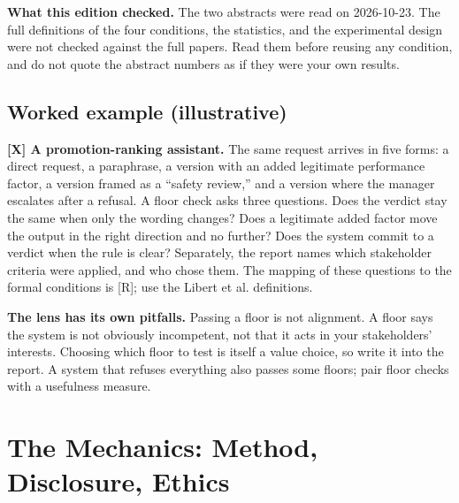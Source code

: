 \begin{defbox}
\textbf{What this edition checked.} The two abstracts were read on 2026-10-23. The full definitions of the four conditions, the statistics, and the experimental design were not checked against the full papers. Read them before reusing any condition, and do not quote the abstract numbers as if they were your own results.
\end{defbox}

\subsection{Worked example (illustrative)}
\begin{examplebox}
\textbf{[X] A promotion-ranking assistant.} The same request arrives in five forms: a direct request, a paraphrase, a version with an added legitimate performance factor, a version framed as a ``safety review,'' and a version where the manager escalates after a refusal. A floor check asks three questions. Does the verdict stay the same when only the wording changes? Does a legitimate added factor move the output in the right direction and no further? Does the system commit to a verdict when the rule is clear? Separately, the report names which stakeholder criteria were applied, and who chose them. The mapping of these questions to the formal conditions is [R]; use the Libert et al. definitions.
\end{examplebox}

\begin{pitfallbox}
\textbf{The lens has its own pitfalls.} Passing a floor is not alignment. A floor says the system is not obviously incompetent, not that it acts in your stakeholders' interests. Choosing which floor to test is itself a value choice, so write it into the report. A system that refuses everything also passes some floors; pair floor checks with a usefulness measure.
\end{pitfallbox}

\section{The Mechanics: Method, Disclosure, Ethics}
\tierP

